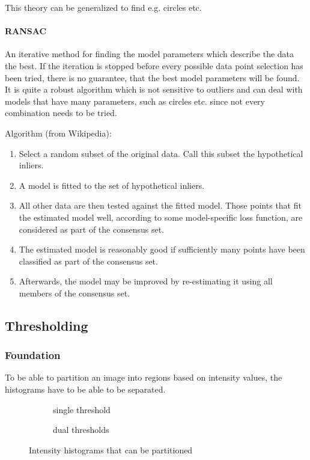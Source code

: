 This theory can be generalized to find e.g. circles etc.

\paragraph{RANSAC}
An iterative method for finding the model parameters which describe the data the best. If the iteration is stopped before every possible data point selection has been tried, there is no guarantee, that the best model parameters will be found. It is quite a robust algorithm which is not sensitive to outliers and can deal with models that have many parameters, such as circles etc. since not every combination needs to be tried.

Algorithm (from Wikipedia):
\begin{enumerate}
  \item Select a random subset of the original data. Call this subset the hypothetical inliers.
  \item A model is fitted to the set of hypothetical inliers.
  \item All other data are then tested against the fitted model. Those points that fit the estimated model well, according to some model-specific loss function, are considered as part of the consensus set.
  \item The estimated model is reasonably good if sufficiently many points have been classified as part of the consensus set.
  \item Afterwards, the model may be improved by re-estimating it using all members of the consensus set.
\end{enumerate}


\subsection{Thresholding}
\subsubsection{Foundation}
To be able to partition an image into regions based on intensity values, the histograms have to be able to be separated.
\begin{figure}[ht!]
	\begin{subfigure}{0.5\textwidth}
		\centering
		
		\caption{single threshold}
	\end{subfigure}
	\begin{subfigure}{0.5\textwidth}
		\centering
		
		\caption{dual thresholds}
	\end{subfigure}
	\caption{Intensity histograms that can be partitioned}
\end{figure}

